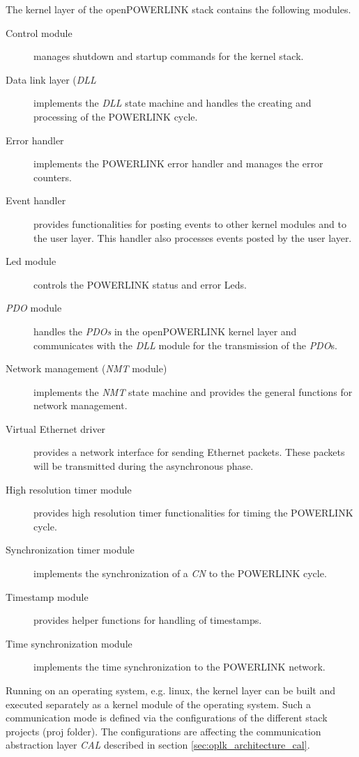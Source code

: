 The kernel layer of the openPOWERLINK stack contains the following modules. \cite[openPOWERLINK Kernel Layer]{openpowerlink_doc}

\begin{description}
    \item[Control module] manages shutdown and startup commands for the kernel stack.
    \item[Data link layer (\emph{DLL}] implements the \emph{DLL} state machine and handles the creating and processing of the POWERLINK cycle.
    \item[Error handler] implements the POWERLINK error handler and manages the error counters.
    \item[Event handler] provides functionalities for posting events to other kernel modules and to the user layer.
    This handler also processes events posted by the user layer.
    \item[Led module] controls the POWERLINK status and error Leds.
    \item[\emph{PDO} module] handles the \emph{PDOs} in the openPOWERLINK kernel layer and communicates with the \emph{DLL} module for the transmission of the \emph{PDO}s.
    \item[Network management (\emph{NMT} module)] implements the \emph{NMT} state machine and provides the general functions for network management.
    \item[Virtual Ethernet driver] provides a network interface for sending Ethernet packets.
    These packets will be transmitted during the asynchronous phase.
    \item[High resolution timer module] provides high resolution timer functionalities for timing the POWERLINK cycle.
    \item[Synchronization timer module] implements the synchronization of a \emph{CN} to the POWERLINK cycle.
    \item[Timestamp module] provides helper functions for handling of timestamps.
    \item[Time synchronization module] implements the time synchronization to the POWERLINK network.
\end{description}

Running on an operating system, e.g. linux, the kernel layer can be built and executed separately as a kernel module of the operating system.
Such a communication mode is defined via the configurations of the different stack projects (proj folder).
The configurations are affecting the communication abstraction layer \emph{CAL} described in section \ref{sec:oplk_architecture_cal}.

